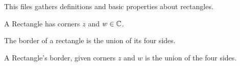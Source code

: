 
This files gathers definitions and basic properties about rectangles.


\begin{definition}\label{Rectangle}\leanok
A Rectangle has corners $z$ and $w \in \C$.
\end{definition}


The border of a rectangle is the union of its four sides.
\begin{definition}[RectangleBorder]\label{RectangleBorder}\leanok
A Rectangle's border, given corners $z$ and $w$ is the union of the four sides.
\end{definition}

